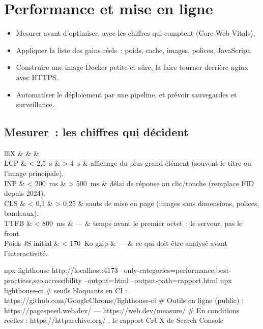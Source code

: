 \chapter{Performance et mise en ligne}
\label{ch-deploy}

\begin{objectif}
\begin{itemize}
  \item Mesurer avant d'optimiser, avec les chiffres qui comptent (Core Web Vitals).
  \item Appliquer la liste des gains r\'eels~: poids, cache, images, polices, JavaScript.
  \item Construire une image Docker petite et s\^ure, la faire tourner derri\`ere nginx avec HTTPS.
  \item Automatiser le d\'eploiement par une pipeline, et pr\'evoir sauvegardes et surveillance.
\end{itemize}
\end{objectif}

\section{Mesurer~: les chiffres qui d\'ecident}

\begin{tabz}{lllX}
  \headrow {} \&  \&  \&  \\
  \midrule
  LCP \& < 2{,}5~s \& > 4~s \& affichage du plus grand \'el\'ement (souvent le titre ou l'image principale). \\
  INP \& < 200~ms \& > 500~ms \& d\'elai de r\'eponse au clic/touche (remplace FID depuis 2024). \\
  CLS \& < 0{,}1 \& > 0{,}25 \& sauts de mise en page (images sans dimensions, polices, bandeaux). \\
  TTFB \& < 800~ms \& --- \& temps avant le premier octet~: le serveur, pas le front. \\
  Poids JS initial \& < 170~Ko gzip \& --- \& ce qui doit \^etre analys\'e avant l'interactivit\'e. \\
\end{tabz}

\begin{terminal}
npx lighthouse http://localhost:4173 --only-categories=performance,best-practices,seo,accessibility --output=html --output-path=rapport.html
npx lighthouse-ci   # seuils bloquants en CI : https://github.com/GoogleChrome/lighthouse-ci
# Outils en ligne (public) : https://pagespeed.web.dev/  ---  https://web.dev/measure/
# En conditions reelles : https://httparchive.org/ , le rapport CrUX de Search Console
\end{terminal}

